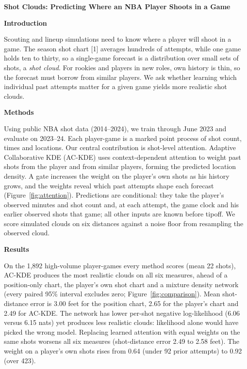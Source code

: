 \documentclass[11pt,letterpaper]{article}
\author{Aaron John Danielson\\
The University of Texas at Austin\\
\href{mailto:aaron.danielson@austin.utexas.edu}{aaron.danielson@austin.utexas.edu}}
\newcommand{\abstractsection}[1]{\par\vspace{3pt}\noindent\textbf{#1}\par\nobreak}
\begin{document}
\begin{center}
{\large\bfseries Shot Clouds: Predicting Where an NBA Player Shoots in a Game}
\par\vspace{5pt}
{\small\makeatletter\@author\makeatother}
\end{center}
\vspace{-8pt}

\abstractsection{Introduction}
Scouting and lineup simulations need to know where a player will shoot in a game. The season shot chart [1] averages hundreds of attempts, while one game holds ten to thirty, so a single-game forecast is a distribution over small sets of shots, a \emph{shot cloud}. For rookies and players in new roles, own history is thin, so the forecast must borrow from similar players. We ask whether learning which individual past attempts matter for a given game yields more realistic shot clouds.

\abstractsection{Methods}
Using public NBA shot data (2014--2024), we train through June 2023 and evaluate on 2023--24. Each player-game is a marked point process of shot count, times and locations. Our central contribution is shot-level attention. Adaptive Collaborative KDE (AC-KDE) uses context-dependent attention to weight past shots from the player and from similar players, forming the predicted location density. A gate increases the weight on the player's own shots as his history grows, and the weights reveal which past attempts shape each forecast (Figure~\ref{fig:attention}). Predictions are conditional: they take the player's observed minutes and shot count and, at each attempt, the game clock and his earlier observed shots that game; all other inputs are known before tipoff. We score simulated clouds on six distances against a noise floor from resampling the observed cloud.

\abstractsection{Results}
On the 1,892 high-volume player-games every method scores (mean 22 shots), AC-KDE produces the most realistic clouds on all six measures, ahead of a position-only chart, the player's own shot chart and a mixture density network (every paired 95\% interval excludes zero; Figure~\ref{fig:comparison}). Mean shot-distance error is 3.00 feet for the position chart, 2.65 for the player's chart and 2.49 for AC-KDE. The network has lower per-shot negative log-likelihood (6.06 versus 6.15 nats) yet produces less realistic clouds: likelihood alone would have picked the wrong model. Replacing learned attention with equal weights on the same shots worsens all six measures (shot-distance error 2.49 to 2.58 feet). The weight on a player's own shots rises from 0.64 (under 92 prior attempts) to 0.92 (over 423).
\end{document}
